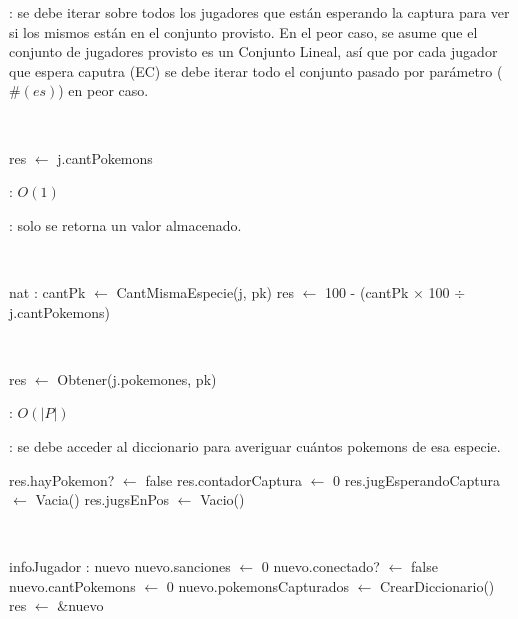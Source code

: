 \begin{Algoritmos}
	\justifcomp: se debe iterar sobre todos los jugadores que están esperando la captura para ver si los mismos están en el conjunto provisto. En el peor caso, se asume que el conjunto de jugadores provisto es un Conjunto Lineal, así que por cada jugador que espera caputra (EC) se debe iterar todo el conjunto pasado por parámetro ($\#(es)$) en peor caso.

	~

	\begin{algorithm}[H]
		\NoCaptionOfAlgo
		\caption{}
		res $\leftarrow$ j.cantPokemons
	\end{algorithm}

	\complejidad: $O(1)$

	\justifcomp: solo se retorna un valor almacenado.

	~

	\begin{algorithm}[H]
		\NoCaptionOfAlgo
		\caption{}
		nat : cantPk $\leftarrow$ CantMismaEspecie(j, pk)
		res $\leftarrow$ 100 - (cantPk $\times$ 100 $\div$ j.cantPokemons)
	\end{algorithm}

	~

	\begin{algorithm}[H]
		\NoCaptionOfAlgo
		\caption{}
		res $\leftarrow$ Obtener(j.pokemones, pk)
	\end{algorithm}

	\complejidad: $O(|P|)$

	\justifcomp: se debe acceder al diccionario para averiguar cuántos pokemons de esa especie.



	\begin{algorithm}[H]
		\NoCaptionOfAlgo
		\caption{}
		\BlankLine
		res.hayPokemon? $\leftarrow$ false
		res.contadorCaptura $\leftarrow$ 0
		res.jugEsperandoCaptura $\leftarrow$ Vacia()
		res.jugsEnPos $\leftarrow$ Vacio()
	\end{algorithm}
	
	~

	\begin{algorithm}[H]
		\NoCaptionOfAlgo
		\caption{}
		\BlankLine
		infoJugador : nuevo
		nuevo.sanciones $\leftarrow$ 0
		nuevo.conectado? $\leftarrow$ false
		nuevo.cantPokemons $\leftarrow$ 0
		nuevo.pokemonsCapturados $\leftarrow$ CrearDiccionario()
		res $\leftarrow$ \&nuevo
	\end{algorithm}


\end{Algoritmos}
